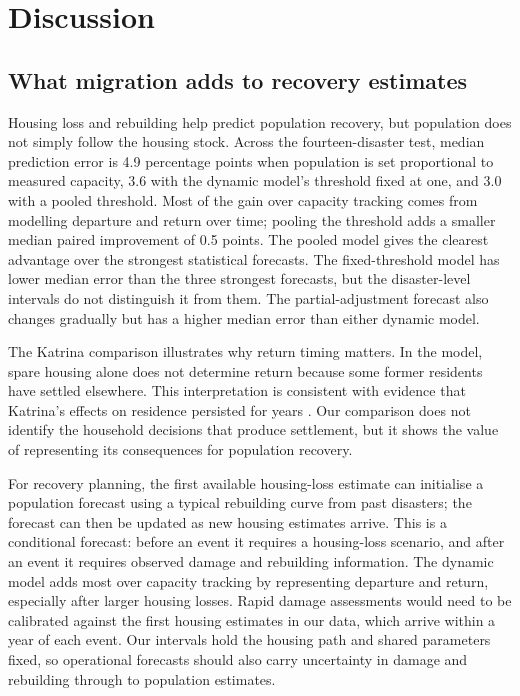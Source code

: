 \documentclass[11pt]{article}
\begin{document}
\section*{Discussion}

\subsection*{What migration adds to recovery estimates}



Housing loss and rebuilding help predict population recovery, but population does not simply follow the housing stock. Across the fourteen-disaster test, median prediction error is 4.9 percentage points when population is set proportional to measured capacity, 3.6 with the dynamic model's threshold fixed at one, and 3.0 with a pooled threshold. Most of the gain over capacity tracking comes from modelling departure and return over time; pooling the threshold adds a smaller median paired improvement of 0.5 points. The pooled model gives the clearest advantage over the strongest statistical forecasts. The fixed-threshold model has lower median error than the three strongest forecasts, but the disaster-level intervals do not distinguish it from them. The partial-adjustment forecast also changes gradually but has a higher median error than either dynamic model.

The Katrina comparison illustrates why return timing matters. In the model, spare housing alone does not determine return because some former residents have settled elsewhere. This interpretation is consistent with evidence that Katrina's effects on residence persisted for years \citep{Deryugina2018}. Our comparison does not identify the household decisions that produce settlement, but it shows the value of representing its consequences for population recovery.

For recovery planning, the first available housing-loss estimate can initialise a population forecast using a typical rebuilding curve from past disasters; the forecast can then be updated as new housing estimates arrive. This is a conditional forecast: before an event it requires a housing-loss scenario, and after an event it requires observed damage and rebuilding information. The dynamic model adds most over capacity tracking by representing departure and return, especially after larger housing losses. Rapid damage assessments would need to be calibrated against the first housing estimates in our data, which arrive within a year of each event. Our intervals hold the housing path and shared parameters fixed, so operational forecasts should also carry uncertainty in damage and rebuilding through to population estimates.
\end{document}

